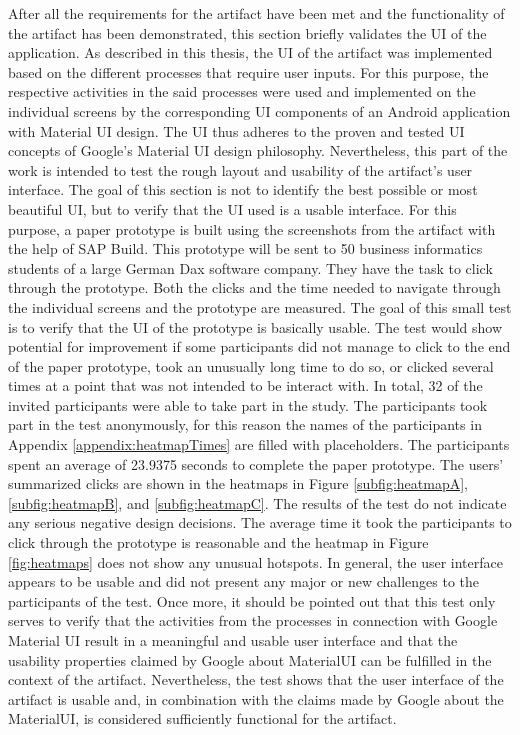 After all the requirements for the artifact have been met and the functionality of the artifact has been demonstrated, this section briefly validates the UI of the application. As described in this thesis, the UI of the artifact was implemented based on the different processes that require user inputs. For this purpose, the respective activities in the said processes were used and implemented on the individual screens by the corresponding UI components of an Android application with Material UI design. The UI thus adheres to the proven and tested UI concepts of Google's Material UI design philosophy. Nevertheless, this part of the work is intended to test the rough layout and usability of the artifact's user interface. The goal of this section is not to identify the best possible or most beautiful UI, but to verify that the UI used is a usable interface. For this purpose, a paper prototype is built using the screenshots from the artifact with the help of SAP Build. This prototype will be sent to 50 business informatics students of a large German Dax software company. They have the task to click through the prototype. Both the clicks and the time needed to navigate through the individual screens and the prototype are measured. The goal of this small test is to verify that the UI of the prototype is basically usable. The test would show potential for improvement if some participants did not manage to click to the end of the paper prototype, took an unusually long time to do so, or clicked several times at a point that was not intended to be interact with. In total, 32 of the invited participants were able to take part in the study. The participants took part in the test anonymously, for this reason the names of the participants in Appendix \ref{appendix:heatmapTimes} are filled with placeholders. The participants spent an average of 23.9375 seconds to complete the paper prototype. The users' summarized clicks are shown in the heatmaps in Figure \ref{subfig:heatmapA}, \ref{subfig:heatmapB}, and \ref{subfig:heatmapC}. The results of the test do not indicate any serious negative design decisions. The average time it took the participants to click through the prototype is reasonable and the heatmap in Figure \ref{fig:heatmaps} does not show any unusual hotspots. In general, the user interface appears to be usable and did not present any major or new challenges to the participants of the test. Once more, it should be pointed out that this test only serves to verify that the activities from the processes in connection with Google Material UI result in a meaningful and usable user interface and that the usability properties claimed by Google about MaterialUI can be fulfilled in the context of the artifact. Nevertheless, the test shows that the user interface of the artifact is usable and, in combination with the claims made by Google about the MaterialUI, is considered sufficiently functional for the artifact. 


